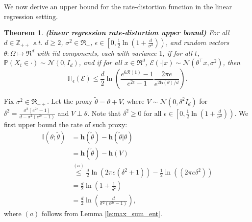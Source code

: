 \documentclass[twoside,11pt]{article}
\renewenvironment{proof}{\par\noindent{\bf Proof\ }}{\hfill\BlackBox\\[2mm]}
\newenvironment{proof}{\par\noindent{\bf Proof\ }}{\hfill\BlackBox\\[2mm]}
\newtheorem{theorem}{Theorem}
\def\environment{\mathcal{E}}
\def\regret{\mathcal{R}}
\def\normal{\mathcal{N}}
\def\diffentropy{\bf h}
\def\proxytheta{\tilde{\theta}}
\def\H{\mathbb{H}}
\def\diffentropy{\mathbf{h}}
\def\I{\mathbb{I}}
\def\Pr{\mathbb{P}}
\begin{document}
We now derive an upper bound for the rate-distortion function in the linear regression setting.
\begin{theorem}{\bf (linear regression rate-distortion upper bound)}
\label{th:lin-reg-rd-general-upper-bound}
For all $d \in \mathbb{Z}_{++}$ s.t. $d \geq 2$, $\sigma^2 \in \Re_{+}$, $\epsilon \in \left[0, \frac{1}{2}\ln\left(1 + \frac{d}{\sigma^2}\right)\right)$, and random vectors $\theta: \Omega\mapsto\Re^d$ with iid components, each with variance $1$, if for all $t$, $\Pr(X_t\in\cdot)\sim \normal(0, I_d)$, and if for all $x \in \Re^d$, $\environment(\cdot|x) \sim \normal(\theta^\top x, \sigma^2)$, then
$$\H_{\epsilon}(\environment) \leq \frac{d}{2}\ln\left(\frac{e^{6\regret(1)}-1}{e^{2\epsilon}-1} \frac{2\pi e}{e^{2\diffentropy(\theta)/d}}\right).$$ 
\end{theorem}
\begin{proof}
    Fix $\sigma^2\in \Re_{++}$. Let the proxy $\tilde{\theta} = \theta + V$, where $V \sim \mathcal{N}(0, \delta^2I_d)$ for $\delta^2 = \frac{\sigma^2(e^{2\epsilon}-1)}{d - \sigma^2(e^{2\epsilon}-1)}$ and $V\perp \theta$. Note that $\delta^2 \geq 0$ for all $\epsilon \in \left[0, \frac{1}{2}\ln\left(1 + \frac{d}{\sigma^2}\right)\right)$. We first upper bound the rate of such proxy:
    \begin{align*}
        \I(\theta;\proxytheta)
        & = \diffentropy(\proxytheta) - \diffentropy(\proxytheta|\theta)\\
        & = \diffentropy(\proxytheta) - \diffentropy(V)\\
        & \overset{(a)}{\leq} \frac{d}{2}\ln\left(2\pi e \left(\delta^2 + 1\right)\right) - \frac{1}{2}\ln\left(\left(2\pi e \delta^2\right)\right)\\
        & = \frac{d}{2}\ln\left(1 + \frac{1}{\delta^2}\right)\\
        & = \frac{d}{2}\ln\left(\frac{d}{\sigma^2\left(e^{2\epsilon}-1\right)}\right),
    \end{align*}
    where $(a)$ follows from Lemma \ref{le:max_sum_ent}.
    

\end{proof}
\end{document}
